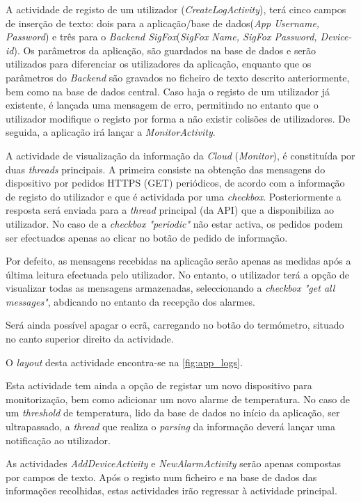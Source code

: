 \documentclass[a4paper]{article}
\begin{document}
A actividade de registo de um utilizador (\textit{CreateLogActivity}), terá cinco campos de inserção de texto: dois para a aplicação/base de dados(\textit{App Username, Password}) e três para o \textit{Backend SigFox}(\textit{SigFox Name, SigFox Password, Device-id}). Os parâmetros da aplicação, são guardados na base de dados e serão utilizados para diferenciar os utilizadores da aplicação, enquanto que os parâmetros do \textit{Backend} são gravados no ficheiro de texto descrito anteriormente, bem como na base de dados central. Caso haja o registo de um utilizador já existente, é lançada uma mensagem de erro, permitindo no entanto que o utilizador modifique o registo por forma a não existir colisões de utilizadores. De seguida, a aplicação irá lançar a \textit{MonitorActivity}.

A actividade de visualização da informação da \textit{Cloud} (\textit{Monitor}), é constituída por duas \textit{threads} principais. A primeira consiste na obtenção das mensagens do dispositivo por pedidos HTTPS (GET) periódicos, de acordo com a informação de registo do utilizador e que é actividada por uma \textit{checkbox}. Posteriormente a resposta será enviada para a \textit{thread} principal (da API) que a disponibiliza ao utilizador. No caso de a \textit{checkbox "periodic"} não estar activa, os pedidos podem ser efectuados apenas ao clicar no botão de pedido de informação.

Por defeito, as mensagens recebidas na aplicação serão apenas as medidas após a última leitura efectuada pelo utilizador. No entanto, o utilizador terá a opção de visualizar todas as mensagens armazenadas, seleccionando a \textit{checkbox "get all messages"}, abdicando no entanto da recepção dos alarmes. 

Será ainda possível apagar o ecrã, carregando no botão do termómetro, situado no canto superior direito da actividade.

 O \textit{layout} desta actividade encontra-se na \autoref{fig:app_logs}.

Esta actividade tem ainda a opção de registar um novo dispositivo para monitorização, bem como adicionar um novo alarme de temperatura. No caso de um \textit{threshold} de temperatura, lido da base de dados no início da aplicação, ser ultrapassado, a \textit{thread} que realiza o \textit{parsing} da informação deverá lançar uma notificação ao utilizador.

As actividades \textit{AddDeviceActivity} e \textit{NewAlarmActivity} serão apenas compostas por campos de texto. Após o registo num ficheiro e na base de dados das informações recolhidas, estas actividades irão regressar à actividade principal.
\end{document}
